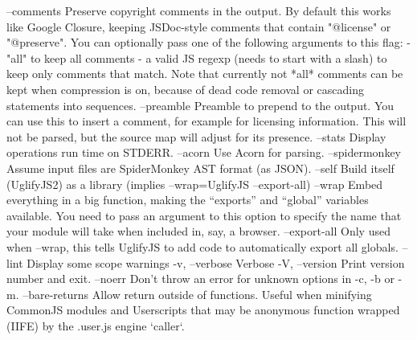 \begin{DoxyCode}
--comments                    Preserve copyright comments in the output. By
                              default this works like Google Closure, keeping
                              JSDoc-style comments that contain "@license" or
                              "@preserve". You can optionally pass one of the
                              following arguments to this flag:
                              - "all" to keep all comments
                              - a valid JS regexp (needs to start with a
                              slash) to keep only comments that match.
                              Note that currently not *all* comments can be
                              kept when compression is on, because of dead
                              code removal or cascading statements into
                              sequences.
--preamble                    Preamble to prepend to the output.  You can use
                              this to insert a comment, for example for
                              licensing information.  This will not be
                              parsed, but the source map will adjust for its
                              presence.
--stats                       Display operations run time on STDERR.
--acorn                       Use Acorn for parsing.
--spidermonkey                Assume input files are SpiderMonkey AST format
                              (as JSON).
--self                        Build itself (UglifyJS2) as a library (implies
                              --wrap=UglifyJS --export-all)
--wrap                        Embed everything in a big function, making the
                              “exports” and “global” variables available. You
                              need to pass an argument to this option to
                              specify the name that your module will take
                              when included in, say, a browser.
--export-all                  Only used when --wrap, this tells UglifyJS to
                              add code to automatically export all globals.
--lint                        Display some scope warnings
-v, --verbose                 Verbose
-V, --version                 Print version number and exit.
--noerr                       Don't throw an error for unknown options in -c,
                              -b or -m.
--bare-returns                Allow return outside of functions.  Useful when
                              minifying CommonJS modules and Userscripts that
                              may be anonymous function wrapped (IIFE) by the
                              .user.js engine `caller`.

\end{DoxyCode}
